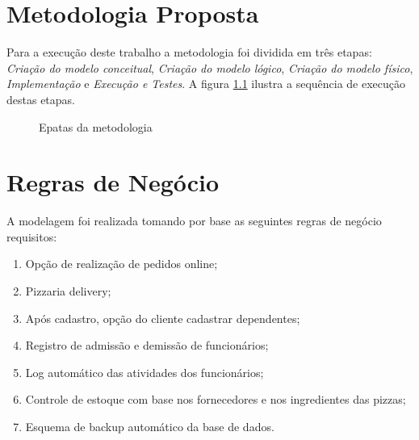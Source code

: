 \documentclass[
	12pt,				%
	openright,			%
	oneside,			%
	a4paper,			%
	chapter=TITLE,		%
	section=TITLE,		%
	english,			%
	brazil				%
	]{abntex2}
\begin{document}
\chapter{Metodologia Proposta}

Para a execução deste trabalho a metodologia foi dividida em três 
etapas: \emph{Criação do modelo conceitual}, \emph{Criação do modelo lógico}, 
\emph{Criação do modelo físico}, \emph{Implementação} e \emph{Execução e Testes}. 
A figura \ref{figuramet} ilustra a sequência de execução destas etapas.

\begin{figure}[h]
    \caption{Epatas da metodologia}
    \centering


    \label{figuramet}
\end{figure}

\chapter {Regras de Negócio}

A modelagem foi realizada tomando por base as seguintes regras de negócio
    requisitos:
    \begin {enumerate}
        \item Opção de realização de pedidos online;
        \item Pizzaria delivery;
        \item Após cadastro, opção do cliente cadastrar dependentes;
        \item Registro de admissão e demissão de funcionários;
        \item Log automático das atividades dos funcionários;
        \item Controle de estoque com base nos fornecedores e nos ingredientes das pizzas;
        \item Esquema de backup automático da base de dados.
    \end {enumerate}
\end{document}
